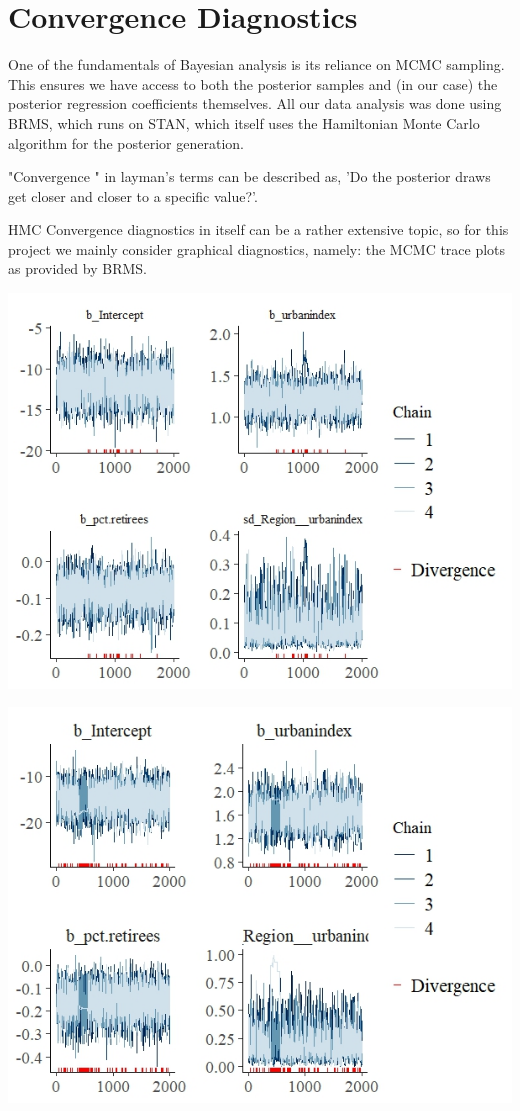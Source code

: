 \documentclass[12pt]{article}
\begin{document}
\FloatBarrier
\section{Convergence Diagnostics}

One of the fundamentals of Bayesian analysis is its reliance on MCMC sampling. This ensures we have access to both the posterior samples and (in our case) the posterior regression coefficients themselves. All our data analysis was done using BRMS, which runs on STAN, which itself uses the Hamiltonian Monte Carlo algorithm for the posterior generation. 

"Convergence " in layman's terms can be described as, 'Do the posterior draws get closer and closer to a specific value?'.

HMC Convergence diagnostics in itself can be a rather extensive topic, so for this project we mainly consider graphical diagnostics, namely: the MCMC trace plots as provided by BRMS.

\includegraphics[scale = 1.2]{trace_plots/trace_model2.jpeg}

\includegraphics[scale = 1.2]{trace_plots/trace_model3_part1.jpeg}
\end{document}
